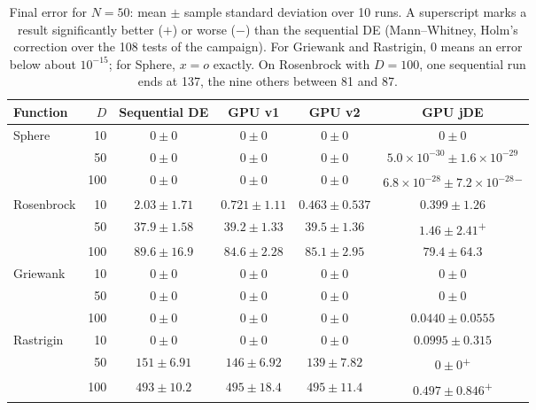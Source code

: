 \documentclass[conference]{IEEEtran}
\begin{document}
\begin{table}[p]
\centering
\caption{Final error for $N=50$: mean $\pm$ sample standard deviation over 10 runs. A superscript
marks a result significantly better ($+$) or worse ($-$) than the sequential DE (Mann--Whitney,
Holm's correction over the 108 tests of the campaign). For Griewank and Rastrigin, 0 means an
error below about $10^{-15}$; for Sphere, $x=o$ exactly. On Rosenbrock with $D=100$, one
sequential run ends at 137, the nine others between 81 and 87.}
\label{tab:err50}
\small\setlength{\tabcolsep}{4pt}
\begin{tabular}{lrcccc}
\toprule
Function & $D$ & Sequential DE & GPU v1 & GPU v2 & GPU jDE\\
\midrule
Sphere & 10 & $0\pm0$ & $0\pm0$ & $0\pm0$ & $0\pm0$\\
 & 50 & $0\pm0$ & $0\pm0$ & $0\pm0$ & $5.0{\times}10^{-30}\pm1.6{\times}10^{-29}$\\
 & 100 & $0\pm0$ & $0\pm0$ & $0\pm0$ & $6.8{\times}10^{-28}\pm7.2{\times}10^{-28}$\textsuperscript{$-$}\\
\midrule
Rosenbrock & 10 & $2.03\pm1.71$ & $0.721\pm1.11$ & $0.463\pm0.537$ & $0.399\pm1.26$\\
 & 50 & $37.9\pm1.58$ & $39.2\pm1.33$ & $39.5\pm1.36$ & $1.46\pm2.41$\textsuperscript{$+$}\\
 & 100 & $89.6\pm16.9$ & $84.6\pm2.28$ & $85.1\pm2.95$ & $79.4\pm64.3$\\
\midrule
Griewank & 10 & $0\pm0$ & $0\pm0$ & $0\pm0$ & $0\pm0$\\
 & 50 & $0\pm0$ & $0\pm0$ & $0\pm0$ & $0\pm0$\\
 & 100 & $0\pm0$ & $0\pm0$ & $0\pm0$ & $0.0440\pm0.0555$\\
\midrule
Rastrigin & 10 & $0\pm0$ & $0\pm0$ & $0\pm0$ & $0.0995\pm0.315$\\
 & 50 & $151\pm6.91$ & $146\pm6.92$ & $139\pm7.82$ & $0\pm0$\textsuperscript{$+$}\\
 & 100 & $493\pm10.2$ & $495\pm18.4$ & $495\pm11.4$ & $0.497\pm0.846$\textsuperscript{$+$}\\
\bottomrule
\end{tabular}


\end{table}
\end{document}
